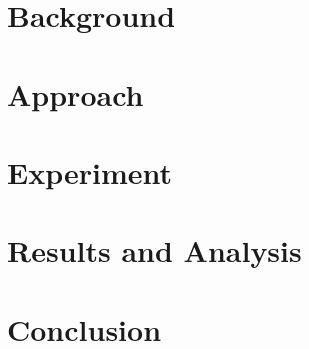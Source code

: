\documentclass[sigconf]{acmart}
\begin{document}
 \section{Background}
 \label{sec:background}


%

\section{Approach}
 \label{sec:approach}


\section{Experiment}
 \label{sec:experiment}


 \section{Results and Analysis}
 \label{sec:results}


\vspace{-5pt}
\section{Conclusion}
\label{sec:future}


%

\vspace{-10pt}


%

\end{document}
